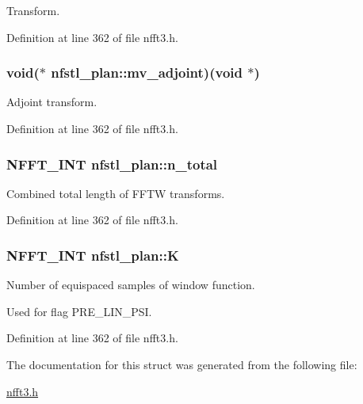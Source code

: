 Transform. 



Definition at line 362 of file nfft3.\-h.

\hypertarget{structnfstl__plan_a1eca782b8267b78a6effc382c0a5b9f4}{
\subsubsection[{mv\-\_\-adjoint}]{\setlength{\rightskip}{0pt plus 5cm}void($\ast$ nfstl\-\_\-plan\-::mv\-\_\-adjoint)(void $\ast$)}}\label{structnfstl__plan_a1eca782b8267b78a6effc382c0a5b9f4}


Adjoint transform. 



Definition at line 362 of file nfft3.\-h.

\hypertarget{structnfstl__plan_a099a9e255702d2cac3ede9ad8ae43408}{
\subsubsection[{n\-\_\-total}]{\setlength{\rightskip}{0pt plus 5cm}N\-F\-F\-T\-\_\-\-I\-N\-T nfstl\-\_\-plan\-::n\-\_\-total}}\label{structnfstl__plan_a099a9e255702d2cac3ede9ad8ae43408}


Combined total length of F\-F\-T\-W transforms. 



Definition at line 362 of file nfft3.\-h.

\hypertarget{structnfstl__plan_a2fd14975632f1894db472ee71f962c33}{
\subsubsection[{K}]{\setlength{\rightskip}{0pt plus 5cm}N\-F\-F\-T\-\_\-\-I\-N\-T nfstl\-\_\-plan\-::\-K}}\label{structnfstl__plan_a2fd14975632f1894db472ee71f962c33}


Number of equispaced samples of window function. 

Used for flag P\-R\-E\-\_\-\-L\-I\-N\-\_\-\-P\-S\-I. 

Definition at line 362 of file nfft3.\-h.



The documentation for this struct was generated from the following file\-:\begin{DoxyCompactItemize}
\item 
\hyperlink{nfft3_8h}{nfft3.\-h}\end{DoxyCompactItemize}
